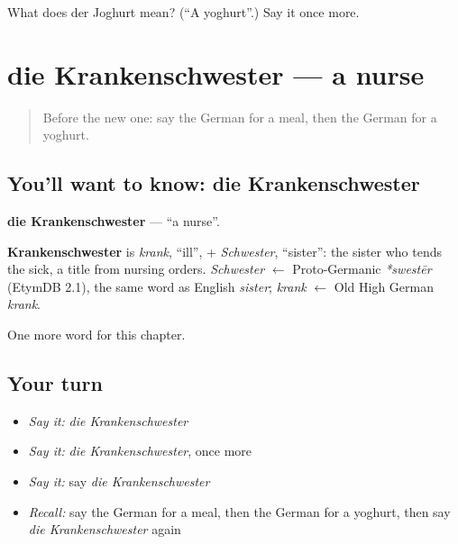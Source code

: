 \begin{tcolorbox}[breakable,colback=teal!4,colframe=teal!35!black,title={Before you move on}]
What does der Joghurt mean? (\textquotedblleft{}A yoghurt\textquotedblright{}.) Say it once more.
\end{tcolorbox}
\section[die Krankenschwester]{die Krankenschwester — a nurse}

\label{lesson:GE-C124-krankenschwester}



\begin{quote}
Before the new one: say the German for a meal, then the German for a yoghurt.
\end{quote}

\subsection*{You'll want to know: die Krankenschwester}
\textbf{die Krankenschwester} — \textquotedblleft{}a nurse\textquotedblright{}.

\begin{cousinweb}
\textbf{Krankenschwester} is \emph{krank}, \textquotedblleft{}ill\textquotedblright{}, + \emph{Schwester}, \textquotedblleft{}sister\textquotedblright{}: the sister who tends the sick, a title from nursing orders. \emph{Schwester} $\leftarrow$ Proto-Germanic \emph{*swestēr} (EtymDB 2.1), the same word as English \emph{sister}; \emph{krank} $\leftarrow$ Old High German \emph{krank}.
\end{cousinweb}

\begin{grammarlens}[title={What you've built}]
One more word for this chapter.
\end{grammarlens}

\subsection*{Your turn}
\begin{itemize}
\raggedright
  \item \emph{Say it:} \emph{die Krankenschwester}
  \item \emph{Say it:} \emph{die Krankenschwester}, once more
  \item \emph{Say it:} say \emph{die Krankenschwester}
  \item \emph{Recall:} say the German for a meal, then the German for a yoghurt, then say \emph{die Krankenschwester} again
\end{itemize}

